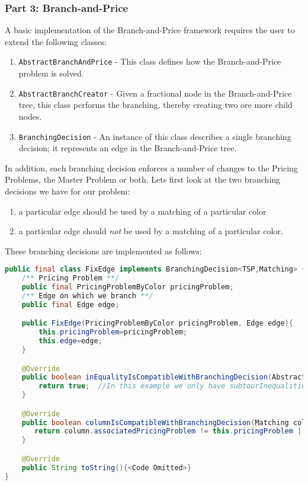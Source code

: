\documentclass[a4paper]{article}
\newenvironment{myblock}[1]{%
    \tcolorbox[beamer,%
    noparskip,breakable,
    colback=lightBlueCodeBlock,colframe=darkBlueCodeBlock,%
    colbacklower=darkBlueCodeBlock!75!lightBlueCodeBlock,%
    coltitle=blueTitleCodeBlock,
    title=#1]}%
    {\endtcolorbox}
\newcommand{\code}[1]{\lstinline[language=java, style=seminar]!#1!}
\begin{document}
\subsubsection{Part 3: Branch-and-Price}
A basic implementation of the Branch-and-Price framework requires the user to extend the following classes:
\begin{enumerate}[nolistsep]
 \item \code{AbstractBranchAndPrice} - This class defines how the Branch-and-Price problem is solved.
 \item \code{AbstractBranchCreator} - Given a fractional node in the Branch-and-Price tree, this class performs the branching, thereby creating two ore more child nodes.
 \item \code{BranchingDecision} - An instance of this class describes a single branching decision; it represents an edge in the Branch-and-Price tree.
\end{enumerate}
In addition, each branching decision enforces a number of changes to the Pricing Problems, the Master Problem or both. 
Lets first look at the two branching decisions we have for our problem:
\begin{enumerate}
 \item a particular edge should be used by a matching of a particular color
 \item a particular edge should \emph{not} be used by a matching of a particular color.
\end{enumerate}
These branching decisions are implemented as follows:
\begin{myblock}{Branching decision 1: FixEdge}
\begin{lstlisting}[language=java, style=eclipseArticle, xleftmargin=2em]  
public final class FixEdge implements BranchingDecision<TSP,Matching> {
    /** Pricing Problem **/
    public final PricingProblemByColor pricingProblem;
    /** Edge on which we branch **/
    public final Edge edge;

    public FixEdge(PricingProblemByColor pricingProblem, Edge edge){
        this.pricingProblem=pricingProblem;
        this.edge=edge;
    }

    @Override
    public boolean inEqualityIsCompatibleWithBranchingDecision(AbstractInequality inequality) {
        return true;  //In this example we only have subtourInequalities. They remain valid, independent of whether we fix an edge.
    }

    @Override
    public boolean columnIsCompatibleWithBranchingDecision(Matching column) {
       return column.associatedPricingProblem != this.pricingProblem || column.edges.contains(edge);
    }

    @Override
    public String toString(){<Code Omitted>}
}
\end{lstlisting}
\end{myblock}
\end{document}
